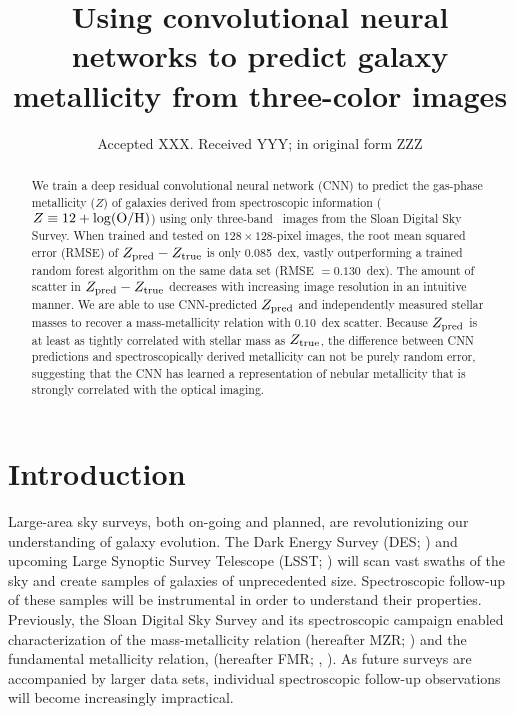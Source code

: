 \documentclass[fleqn,usenatbib]{mnras}
\title[Metallicity with CNNs]{Using convolutional neural networks to predict galaxy metallicity from three-color images}
\author[Wu and Boada]
{\parbox{\textwidth}{John~F.~Wu$^{1}$\thanks{E-mail: \href{mailto:jw740@physics.rutgers.edu}} and
Steven~Boada$^{1}$}\vspace{0.4cm}\
\\
\parbox{\textwidth}{$^{1}$Department of Physics and Astronomy, Rutgers, The State University of New Jersey, 136 Frelinghuysen Road, Piscataway, NJ 08854-8019, USA\\}}
\date{Accepted XXX. Received YYY; in original form ZZZ}
\begin{document}
\label{firstpage}
\pagerange{\pageref{firstpage}--\pageref{lastpage}}
\maketitle

\begin{abstract}
We train a deep residual convolutional neural network (CNN) to predict the gas-phase metallicity ($Z$) of galaxies derived from spectroscopic information ($Z \equiv 12 + \log(\rm O/H)$) using only three-band \sdssg\sdssr\sdssi\ images from the Sloan Digital Sky Survey. When trained and tested on $128 \times 128$-pixel images, the root mean squared error (RMSE) of $Z_{\rm pred} - Z_{\rm true}$ is only 0.085~dex, vastly outperforming a trained random forest algorithm on the same data set (RMSE $=0.130$~dex). The amount of scatter in $Z_{\rm pred} - Z_{\rm true}$ decreases with increasing image resolution in an intuitive manner. We are able to use CNN-predicted $Z_{\rm pred}$ and independently measured stellar masses to recover a mass-metallicity relation with $0.10$~dex scatter. Because $Z_{\rm pred}$ is at least as tightly correlated with stellar mass as $Z_{\rm true}$, the difference between CNN predictions and spectroscopically derived metallicity can not be purely random error, suggesting that the CNN has learned a representation of nebular metallicity that is strongly correlated with the optical imaging.
\end{abstract}

\section{Introduction}\label{sec:introduction}
Large-area sky surveys, both on-going and planned, are revolutionizing our understanding of galaxy evolution. The Dark Energy Survey (DES; \citealt{DES2005}) and upcoming Large Synoptic Survey Telescope (LSST; \citealt{LSST2012}) will scan vast swaths of the sky and create samples of galaxies of unprecedented size. Spectroscopic follow-up of these samples will be instrumental in order to understand their properties. Previously, the Sloan Digital Sky Survey \citep[SDSS;][]{York2000} and its spectroscopic campaign enabled characterization of the mass-metallicity relation (hereafter MZR; \citealt{Tremonti2004}) and the fundamental metallicity relation, (hereafter FMR; \eg, \citealt{Mannucci2010}). As future surveys are accompanied by larger data sets, individual spectroscopic follow-up observations will become increasingly impractical.
\end{document}

